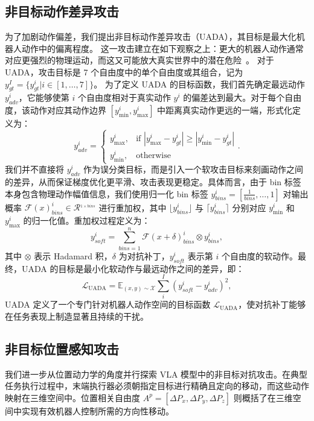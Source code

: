 \subsection{非目标动作差异攻击} \label{Normalized_Action_Discrepancy_Attack}
为了加剧动作偏差，我们提出非目标动作差异攻击（UADA），其目标是最大化机器人动作中的偏离程度。
这一攻击建立在如下观察之上：更大的机器人动作通常对应更强烈的物理运动，而这又可能放大真实世界中的潜在危险~\cite{iso_10218,iso_15066,ISO13482}。
对于 UADA，攻击目标是 7 个自由度中的单个自由度或其组合，记为 $y^I_{gt}=\{y^{i}_{gt}|i\in[1,\dots,7]\}$。
为了定义 UADA 的目标函数，我们首先确定最远动作 $y_{adv}^i$，它能够使第 $i$ 个自由度相对于真实动作 $y^i$ 的偏差达到最大。对于每个自由度，该动作对应其动作边界 $[y_{\min}^i,y_{\max}^i]$ 中距离真实动作更远的一端，形式化定义为：
\begin{equation}
y_{adv}^i =
\begin{cases} 
y_{\max}^i, & \text{if } |y_{\max}^i-y^i_{gt}| \geq |y_{\min}^i-y^i_{gt}| \\
y_{\min}^i, & \text{otherwise}
\end{cases}.
\end{equation}
我们并不直接将 $y_{adv}^i$ 作为误分类目标，而是引入一个软攻击目标来刻画动作之间的差异，从而保证梯度优化更平滑、攻击表现更稳定。具体而言，由于 bin 标签本身包含物理动作幅值信息，我们使用归一化 bin 标签 $y^i_{bins}=[\frac{1}{bins},\dots,1]$ 对输出概率 $\mathcal{F}(x)^i_{bins}\in\mathcal{R}^{_{1\times{bins}}}$ 进行重加权，其中 $\lfloor y^i_{bins} \rfloor$ 与 $\lceil y^i_{bins} \rceil$ 分别对应 $y_{\min}^i$ 和 $y_{\max}^i$ 的归一化值。重加权过程定义为：
\begin{equation}
    y_{soft}^{i}= \sum_{bins=1}^{n}  \mathcal{F}(x+\delta)^i_{bins} \otimes y^i_{bins},
\end{equation}
其中 $\otimes$ 表示 Hadamard 积，$\delta$ 为对抗补丁，$y_{soft}^{i}$ 表示第 $i$ 个自由度的软动作。最终，UADA 的目标是最小化软动作与最远动作之间的差异，即：
\begin{equation}
    \mathcal{L}_{\text{UADA}} = \mathbb{E}_{(x,y)\sim\mathcal{X}}\sum_{i}^{I} (y_{soft}^{i}-y_{adv}^i)^2,
\end{equation}
UADA 定义了一个专门针对机器人动作空间的目标函数 $\mathcal{L}_{\text{UADA}}$，使对抗补丁能够在任务表现上制造显著且持续的干扰。

\subsection{非目标位置感知攻击} \label{Geometry_aware_Attack}
我们进一步从位置动力学的角度并行探索 VLA 模型中的非目标对抗攻击。在典型任务执行过程中，末端执行器必须朝指定目标进行精确且定向的移动，而这些动作映射在三维空间中。位置相关自由度 $A^p = [\Delta{P_x}, \Delta{P_y}, \Delta{P_z}]$ 则概括了在三维空间中实现有效机器人控制所需的方向性移动。

